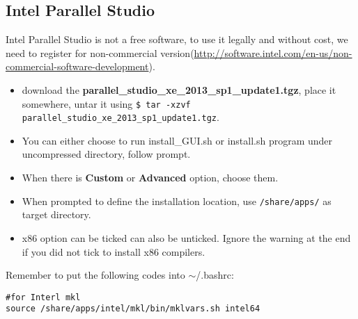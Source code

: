 \subsection{Intel Parallel Studio}
Intel Parallel Studio is not a free software, to use it legally and without cost, we need to register for non-commercial version(\url{http://software.intel.com/en-us/non-commercial-software-development}).
\begin{itemize}
\item download the {\bf parallel\_studio\_xe\_2013\_sp1\_update1.tgz}, place it somewhere, untar it using {\tt \$ tar -xzvf parallel\_studio\_xe\_2013\_sp1\_update1.tgz}.
\item You can either choose to run install\_GUI.sh or install.sh program under uncompressed directory, follow prompt.
\item When there is {\bf Custom} or {\bf Advanced} option, choose them.
\item When prompted to define the installation location, use {\tt /share/apps/} as target directory.
\item x86 option can be ticked can also be unticked. Ignore the warning at the end if you did not tick to install x86 compilers. 
\end{itemize}
\begin{remark}
Remember to put the following codes into $\sim$/.bashrc:
\begin{lstlisting}[basicstyle=\ttfamily\scriptsize,columns=fullflexible]
#for Interl mkl
source /share/apps/intel/mkl/bin/mklvars.sh intel64
\end{lstlisting}
\end{remark}

